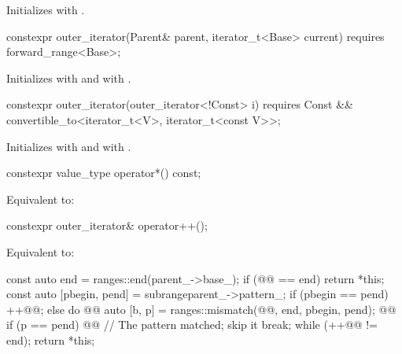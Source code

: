 \documentclass{wg21}
\begin{document}
\begin{itemdescr}
\pnum
\effects Initializes  with .
\end{itemdescr}

%
\begin{itemdecl}
constexpr outer_iterator(Parent& parent, iterator_t<Base> current)
requires forward_range<Base>;
\end{itemdecl}

\begin{itemdescr}
\pnum
\effects Initializes  with 
and  with .
\end{itemdescr}

%
\begin{itemdecl}
constexpr outer_iterator(outer_iterator<!Const> i)
requires Const && convertible_to<iterator_t<V>, iterator_t<const V>>;
\end{itemdecl}

\begin{itemdescr}
\pnum
\effects Initializes  with  and
 with .
\end{itemdescr}

%
\begin{itemdecl}
constexpr value_type operator*() const;
\end{itemdecl}

\begin{itemdescr}
\pnum
\effects Equivalent to: 
\end{itemdescr}

%
\begin{itemdecl}
constexpr outer_iterator& operator++();
\end{itemdecl}

\begin{itemdescr}
\pnum
\effects Equivalent to:
\begin{codeblock}
	const auto end = ranges::end(parent_->base_);
	if (@@ == end) return *this;
	const auto [pbegin, pend] = subrange{parent_->pattern_};
	if (pbegin == pend) ++@@;
	else {
		do {
			@@ auto [b, p] = 
		        ranges::mismatch(@@, end, pbegin, pend);
			@@
			if (p == pend) {
				@@  // The pattern matched; skip it
				break;
			}
		} while (++@@ != end);
	}
	return *this;
\end{codeblock}
\end{itemdescr}
\end{document}
